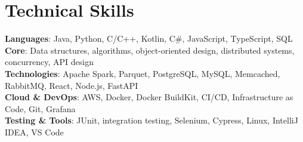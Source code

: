 \documentclass[letterpaper,11pt]{article}
\begin{document}
\section{Technical Skills}
\begin{itemize}[leftmargin=0.15in, label={}]
  \small{\item{
        \textbf{Languages}{: Java, Python, C/C++, Kotlin, C\#, JavaScript, TypeScript, SQL} \\
        \textbf{Core}{: Data structures, algorithms, object-oriented design, distributed systems, concurrency, API design} \\
        \textbf{Technologies}{: Apache Spark, Parquet, PostgreSQL, MySQL, Memcached, RabbitMQ, React, Node.js, FastAPI} \\
        \textbf{Cloud \& DevOps}{: AWS, Docker, Docker BuildKit, CI/CD, Infrastructure as Code, Git, Grafana} \\
        \textbf{Testing \& Tools}{: JUnit, integration testing, Selenium, Cypress, Linux, IntelliJ IDEA, VS Code}
        }}
\end{itemize}


\end{document}
